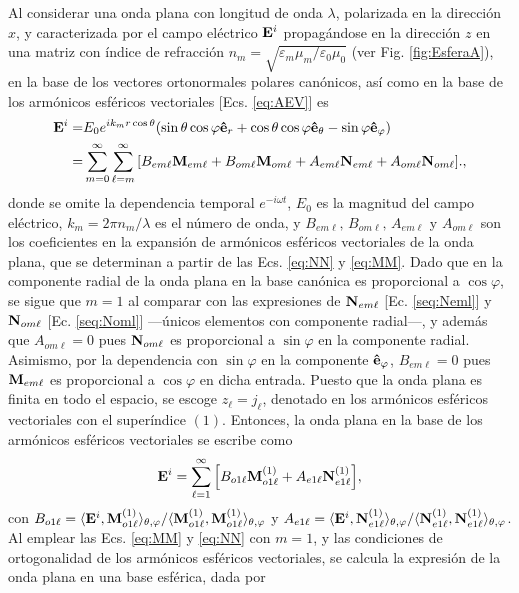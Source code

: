 Al considerar una onda plana con longitud de onda $\lambda$, polarizada en la dirección $x$, y caracterizada por el campo eléctrico $\vb{E}^i$ propagándose en la dirección $z$ en una matriz con índice de refracción $n_m = \sqrt{\varepsilon_m\mu_m / \varepsilon_0\mu_0}$ (ver Fig. \ref{fig:EsferaA}), en la base de los vectores ortonormales polares canónicos, así como en la base de los armónicos esféricos vectoriales [Ecs. \eqref{eq:AEV}] es
	\begin{align*}
\vb{E}^i = & E_0 e^{ik_mr\cos\theta} \qty(\sin\theta\cos\varphi \vu{e}_r + 
								\cos\theta\cos\varphi\vu{e}_\theta-\sin\varphi\vu{e}_\varphi)\notag\\
	 =& \sum_{m=0}^\infty\sum_{\ell=m}^\infty \qty[ B_{em\ell}\vb{M}_{em\ell} 
	 	+ B_{om\ell}\vb{M}_{om\ell} +A_{em\ell}\vb{N}_{em\ell} + A_{om\ell}\vb{N}_{om\ell}].,
	\end{align*}
donde se omite la dependencia temporal $e^{-i\omega t}$, $E_0$ es la magnitud del campo eléctrico, $k_m=2\pi n_m/\lambda$ es el número de onda,  y  $B_{em\ell},\, B_{om\ell},\, A_{em\ell}$ y $ A_{om\ell}$ son los coeficientes en la expansión de armónicos esféricos vectoriales de la onda plana, que se determinan a partir de las Ecs. \eqref{eq:NN} y \eqref{eq:MM}. Dado que en la componente radial de la onda plana en la base canónica es proporcional a $\cos\varphi$, se sigue que $m=1$ al comparar con las expresiones de $\vb{N}_{em\ell}$ [Ec. \eqref{seq:Neml}] y $\vb{N}_{om\ell}$ [Ec. \eqref{seq:Noml}] ---únicos elementos con componente radial---, y además que $A_{om\ell}=0$ pues $\vb{N}_{om\ell}$ es proporcional a $\sin\varphi$ en la componente radial. Asimismo, por la dependencia con $\sin\varphi$ en la componente  $\vu{e}_\varphi$, $B_{em\ell}=0$ pues $\vb{M}_{em\ell}$ es proporcional a $\cos\varphi$ en dicha entrada. Puesto que la onda plana es finita en todo el espacio, se escoge $z_\ell = j_\ell$, denotado en los armónicos esféricos vectoriales con el superíndice $(1)$. Entonces, la onda plana en la base de los armónicos esféricos vectoriales se escribe como 
	\begin{align*}
	\vb{E}^i = \sum_{\ell=1}^\infty \qty[B_{o1\ell}\vb{M}_{o1\ell}^{(1)} + A_{e1\ell}\vb{N}_{e1\ell}^{(1)}],
	\end{align*}
con $B_{o1\ell} = \langle \vb{E}^i, \vb{M}_{o1\ell}^{(1)}  \rangle_{\theta,\varphi} / \langle \vb{M}_{o1\ell}^{(1)} ,\vb{M}_{o1\ell}^{(1)} \rangle_{\theta,\varphi}$ y $ A_{e1\ell} = \langle \vb{E}^i, \vb{N}_{e1\ell}^{(1)} \rangle_{\theta,\varphi} / \langle \vb{N}_{e1\ell}^{(1)},\vb{N}_{e1\ell}^{(1)} \rangle_{\theta,\varphi}$. Al emplear las Ecs. \eqref{eq:MM} y \eqref{eq:NN} con $m=1$, y las condiciones de ortogonalidad de los armónicos esféricos vectoriales, se calcula la expresión de la onda plana en una base esférica, dada por
